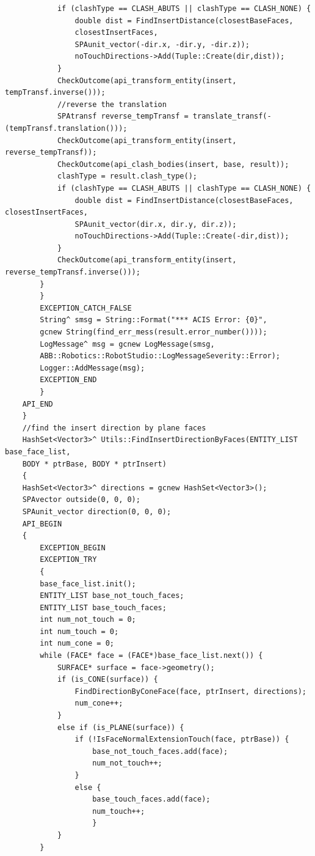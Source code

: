 \documentclass[14pt,a4paper,titlepage]{article}
\begin{document}
\begin{itemize}
\begin{lstlisting}
			if (clashType == CLASH_ABUTS || clashType == CLASH_NONE) {
				double dist = FindInsertDistance(closestBaseFaces,
				closestInsertFaces,
				SPAunit_vector(-dir.x, -dir.y, -dir.z));
				noTouchDirections->Add(Tuple::Create(dir,dist));
			}
			CheckOutcome(api_transform_entity(insert, tempTransf.inverse()));
			//reverse the translation
			SPAtransf reverse_tempTransf = translate_transf(-(tempTransf.translation()));
			CheckOutcome(api_transform_entity(insert, reverse_tempTransf));
			CheckOutcome(api_clash_bodies(insert, base, result));
			clashType = result.clash_type();
			if (clashType == CLASH_ABUTS || clashType == CLASH_NONE) {
				double dist = FindInsertDistance(closestBaseFaces, closestInsertFaces,
				SPAunit_vector(dir.x, dir.y, dir.z));
				noTouchDirections->Add(Tuple::Create(-dir,dist));
			}
			CheckOutcome(api_transform_entity(insert, reverse_tempTransf.inverse()));	
		}
		}
		EXCEPTION_CATCH_FALSE
		String^ smsg = String::Format("*** ACIS Error: {0}",
		gcnew String(find_err_mess(result.error_number())));
		LogMessage^ msg = gcnew LogMessage(smsg,
		ABB::Robotics::RobotStudio::LogMessageSeverity::Error);
		Logger::AddMessage(msg);
		EXCEPTION_END
		}
	API_END
	}
	//find the insert direction by plane faces
	HashSet<Vector3>^ Utils::FindInsertDirectionByFaces(ENTITY_LIST base_face_list,
	BODY * ptrBase, BODY * ptrInsert)
	{
	HashSet<Vector3>^ directions = gcnew HashSet<Vector3>();
	SPAvector outside(0, 0, 0);
	SPAunit_vector direction(0, 0, 0);
	API_BEGIN
	{
		EXCEPTION_BEGIN
		EXCEPTION_TRY
		{
		base_face_list.init();
		ENTITY_LIST base_not_touch_faces;
		ENTITY_LIST base_touch_faces;
		int num_not_touch = 0;
		int num_touch = 0;
		int num_cone = 0;
		while (FACE* face = (FACE*)base_face_list.next()) {
			SURFACE* surface = face->geometry();
			if (is_CONE(surface)) {
				FindDirectionByConeFace(face, ptrInsert, directions);
				num_cone++;
			}
			else if (is_PLANE(surface)) {
				if (!IsFaceNormalExtensionTouch(face, ptrBase)) {
					base_not_touch_faces.add(face);
					num_not_touch++;
				}
				else {
					base_touch_faces.add(face);
					num_touch++;
					}
			}
		}
			

\end{lstlisting}
\end{itemize}
\end{document}

